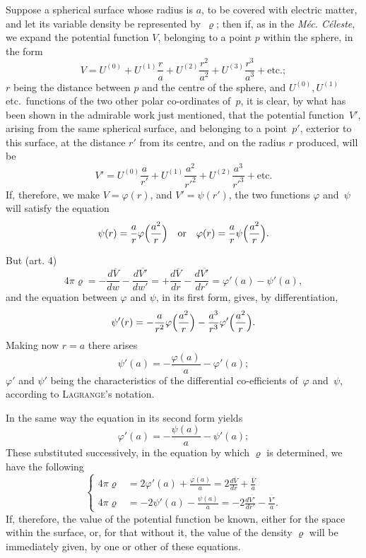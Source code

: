 \documentclass[11pt,notitlepage]{amsart}
\let\Person\textsc
\let\Title\textit
\renewcommand{\rho}{\varrho}
\renewcommand{\phi}{\varphi}
\begin{document}
Suppose a spherical surface whose radius is $a$, to be covered with
electric matter, and let its variable density be represented by~$\rho$;
then if, as
in the \Title{M\'ec. C\'eleste},
we expand the potential function $V$, belonging to a
point $p$ within the sphere, in the form
\[
V=U^{(0)}+U^{(1)}\frac{r}{a}
+U^{(2)}\frac{r^2}{a^2}
+U^{(3)}\frac{r^3}{a^3}
+\text{etc.};
\]
$r$ being the distance between $p$ and the centre of the sphere,
and $U^{(0)},U^{(1)}$
etc.\ functions of the two other polar co-ordinates of~$p$, it is clear, by
what has been shown in the admirable work just mentioned, that the potential
function~$V'$, arising from the same spherical surface, and belonging to a
point~$p'$, exterior to this surface,
at the distance $r'$ from its centre, and on
the radius $r$ produced, will be
\[
V'=U^{(0)}\frac{a}{r'}
+U^{(1)}\frac{a^2}{r'^2}
+U^{(2)}\frac{a^3}{r'^3}
+\text{etc.}
\]
If, therefore, we make $V=\phi(r)$, and $V'=\psi(r')$,
the two functions $\phi$ and~$\psi$
will satisfy the equation
\[
\psi(r)=\frac{a}{r}\phi\Bigl(\frac{a^2}{r}\Bigr)
\quad\text{or}\quad
\phi(r)=\frac{a}{r}\psi\Bigl(\frac{a^2}{r}\Bigr).
\]

But (art. 4)
\[
4\pi\varrho=
-\frac{d\overline{V}}{dw}-\frac{d\overline{V'}}{dw'}
=+\frac{d\overline{V}}{dr}-\frac{d\overline{V'}}{dr'}
=\phi'(a)-\psi'(a),
\]
and the equation between $\phi$ and $\psi$,
in its first form, gives, by differentiation,
\[
\psi'(r)=
-\frac{a}{r^2}\phi\Bigl(\frac{a^2}{r}\Bigr)
-\frac{a^3}{r^3}\phi'\Bigl(\frac{a^2}{r}\Bigr).
\]
Making now $r=a$ there arises
\[
\psi'(a)=-\frac{\phi(a)}{a}-\phi'(a);
\]
$\phi'$ and $\psi'$ being the characteristics of
the differential co-efficients of~$\phi$ and~$\psi$,
according to \Person{Lagrange}'s notation.

In the same way the equation in its second form yields
\[
\phi'(a)=-\frac{\psi(a)}{a}-\psi'(a);
\]
These substituted successively, in the equation
by which $\rho$ is determined, we
have the following
\[
\tag{9.}
\left\{\begin{aligned}
4\pi\rho&=2\phi'(a)+\frac{\phi(a)}{a}
=2\frac{d\overline{V}}{dr}+\frac{\overline{V}}{a}\\
4\pi\rho&=-2\psi'(a)-\frac{\psi(a)}{a}
=-2\frac{d\overline{V'}}{dr'}-\frac{\overline{V'}}{a}.
\end{aligned}\right.
\]
If, therefore, the value of the potential function be known, either for the
space within the surface, or, for that without it,
the value of the density $\rho$
will be immediately given, by one or other of these equations.
\end{document}

